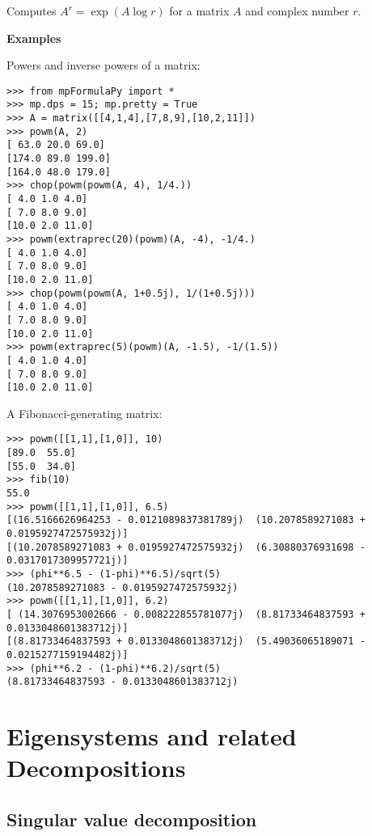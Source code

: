 \vpara
Computes $A^r=\exp(A \log r)$ for a matrix $A$ and complex number $r$.

\vpara
\textbf{Examples}

Powers and inverse powers of a matrix:

\begin{lstlisting}
>>> from mpFormulaPy import *
>>> mp.dps = 15; mp.pretty = True
>>> A = matrix([[4,1,4],[7,8,9],[10,2,11]])
>>> powm(A, 2)
[ 63.0 20.0 69.0]
[174.0 89.0 199.0]
[164.0 48.0 179.0]
>>> chop(powm(powm(A, 4), 1/4.))
[ 4.0 1.0 4.0]
[ 7.0 8.0 9.0]
[10.0 2.0 11.0]
>>> powm(extraprec(20)(powm)(A, -4), -1/4.)
[ 4.0 1.0 4.0]
[ 7.0 8.0 9.0]
[10.0 2.0 11.0]
>>> chop(powm(powm(A, 1+0.5j), 1/(1+0.5j)))
[ 4.0 1.0 4.0]
[ 7.0 8.0 9.0]
[10.0 2.0 11.0]
>>> powm(extraprec(5)(powm)(A, -1.5), -1/(1.5))
[ 4.0 1.0 4.0]
[ 7.0 8.0 9.0]
[10.0 2.0 11.0]
\end{lstlisting}

A Fibonacci-generating matrix:

\begin{lstlisting}
>>> powm([[1,1],[1,0]], 10)
[89.0  55.0]
[55.0  34.0]
>>> fib(10)
55.0
>>> powm([[1,1],[1,0]], 6.5)
[(16.5166626964253 - 0.0121089837381789j)  (10.2078589271083 + 0.0195927472575932j)]
[(10.2078589271083 + 0.0195927472575932j)  (6.30880376931698 - 0.0317017309957721j)]
>>> (phi**6.5 - (1-phi)**6.5)/sqrt(5)
(10.2078589271083 - 0.0195927472575932j)
>>> powm([[1,1],[1,0]], 6.2)
[ (14.3076953002666 - 0.008222855781077j)  (8.81733464837593 + 0.0133048601383712j)]
[(8.81733464837593 + 0.0133048601383712j)  (5.49036065189071 - 0.0215277159194482j)]
>>> (phi**6.2 - (1-phi)**6.2)/sqrt(5)
(8.81733464837593 - 0.0133048601383712j)
\end{lstlisting}



















\chapter{Eigensystems and related Decompositions}


\section{Singular value decomposition}


